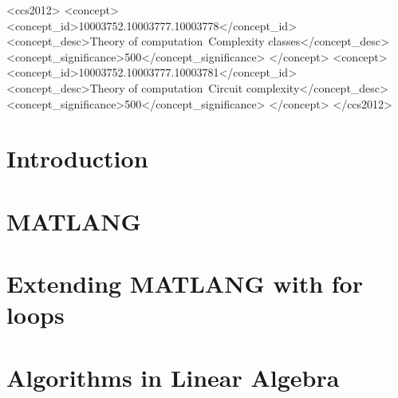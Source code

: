 \documentclass[sigconf]{acmart}
\begin{document}
\begin{CCSXML}
<ccs2012>
<concept>
<concept_id>10003752.10003777.10003778</concept_id>
<concept_desc>Theory of computation~Complexity classes</concept_desc>
<concept_significance>500</concept_significance>
</concept>
<concept>
<concept_id>10003752.10003777.10003781</concept_id>
<concept_desc>Theory of computation~Circuit complexity</concept_desc>
<concept_significance>500</concept_significance>
</concept>
</ccs2012>
\end{CCSXML}



\maketitle

\section{Introduction}




\section{MATLANG}\label{sec:matlang}


\section{Extending MATLANG with for loops}\label{sec:formatlang}



%

\section{Algorithms in Linear Algebra}\label{sec:queries}

\end{document}
